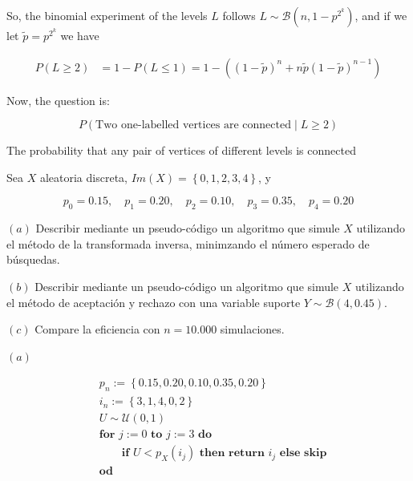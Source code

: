 \documentclass[a4paper, 12pt]{article}
\begin{document}
So, the binomial experiment of the levels $L$ follows $L \sim \mathcal{B}(n, 1 - p^{2^k})$,
and if we let $\widetilde{ p } = p^{2^k} $ we have

\begin{align*}
  P(L \geq 2) 
  &= 1 - P(L \leq 1) = 1 - \left( (1-\widetilde{ p } )^n +
  n\widetilde{ p }(1 - \widetilde{ p } )^{n-1}  \right) 
\end{align*}

Now, the question is:

\begin{equation*}
  P(\text{Two one-labelled vertices are connected} \mid L\geq 2)
\end{equation*}

The probability that any pair of vertices of different levels is connected 

\pagebreak 

\begin{myframe}
  Sea $X$ aleatoria discreta, $Im(X) = \left\{ 0, 1, 2, 3, 4 \right\} $, y 

  \begin{equation*}
    p_0 = 0.15, \quad p_1 = 0.20, \quad p_2 = 0.10, \quad p_3 = 0.35, \quad p_4
    = 0.20
  \end{equation*}

  $(a)$ Describir mediante un pseudo-código un algoritmo que simule $X$
  utilizando el método de la transformada inversa, minimzando el número esperado
  de búsquedas. 

  $(b)$ Describir mediante un pseudo-código un algoritmo que simule $X$
  utilizando el método de aceptación y rechazo con una variable suporte $Y \sim
  \mathcal{B}(4, 0.45)$.

  $(c)$ Compare la eficiencia con $n = 10.000$ simulaciones.
\end{myframe}

$(a)$ 

\begin{align*}
  &p_n := \left\{ 0.15, 0.20, 0.10, 0.35, 0.20 \right\} \\
  &i_n := \left\{ 3, 1, 4, 0, 2 \right\} \\ 
  &U \sim \mathcal{U}(0, 1)\\
  &\textbf{for } j := 0 \textbf{ to } j := 3 \textbf{ do } \\ 
  &\qquad \textbf{if } U < p_X(i_j) \textbf{ then } \textbf{return }
  i_j\textbf{ else } \textbf{skip}\\
  &\textbf{od}
\end{align*}
\end{document}
